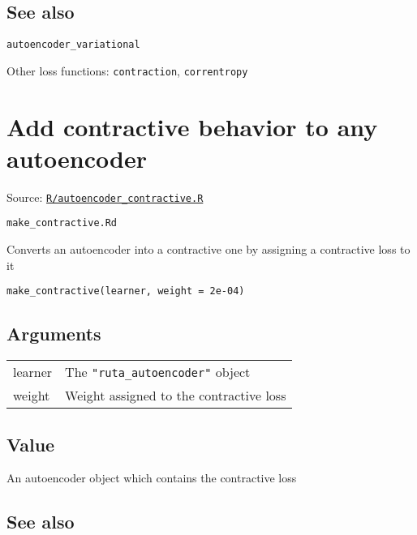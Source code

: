 \hypertarget{see-also}{\subsection{\texorpdfstring{\protect\hyperlink{see-also}{}See
also}{See also}}\label{see-also}}

\texttt{autoencoder\_variational}

Other loss functions: \texttt{contraction}, \texttt{correntropy}

\section{Add contractive behavior to any
autoencoder}\label{add-contractive-behavior-to-any-autoencoder}

Source:
\href{https://github.com/fdavidcl/ruta/blob/master/R/autoencoder_contractive.R}{\texttt{R/autoencoder\_contractive.R}}

\texttt{make\_contractive.Rd}

Converts an autoencoder into a contractive one by assigning a
contractive loss to it

\begin{verbatim}
make_contractive(learner, weight = 2e-04)
\end{verbatim}

\hypertarget{arguments}{\subsection{\texorpdfstring{\protect\hyperlink{arguments}{}Arguments}{Arguments}}\label{arguments}}

\begin{longtable}[c]{@{}ll@{}}
\toprule
learner & The \texttt{"ruta\_autoencoder"} object\tabularnewline
weight & Weight assigned to the contractive loss\tabularnewline
\bottomrule
\end{longtable}

\hypertarget{value}{\subsection{\texorpdfstring{\protect\hyperlink{value}{}Value}{Value}}\label{value}}

An autoencoder object which contains the contractive loss

\hypertarget{see-also}{\subsection{\texorpdfstring{\protect\hyperlink{see-also}{}See
also}{See also}}\label{see-also}}

